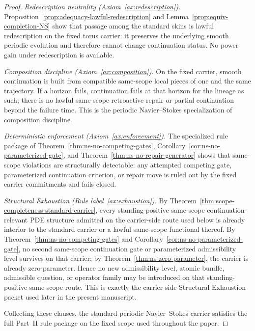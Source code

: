 \begin{proof}
\smallskip
\noindent\textit{Redescription neutrality (Axiom~\ref{ax:redescription}).}
Proposition~\ref{prop:adequacy-lawful-redescription} and Lemma~\ref{prop:equiv-completion-NS}
show that passage among the standard skins is lawful redescription on the fixed torus carrier: it
preserves the underlying smooth periodic evolution and therefore cannot change continuation status.
No power gain under redescription is available.

\smallskip
\noindent\textit{Composition discipline (Axiom~\ref{ax:composition}).}
On the fixed carrier, smooth continuation is built from compatible same-scope local pieces of one and
the same trajectory. If a horizon fails, continuation fails at that horizon for the lineage as such;
there is no lawful same-scope retroactive repair or partial continuation beyond the failure time.
This is the periodic Navier--Stokes specialization of composition discipline.

\smallskip
\noindent\textit{Deterministic enforcement (Axiom~\ref{ax:enforcement}).}
The specialized rule package of Theorem~\ref{thm:ns-no-competing-gates},
Corollary~\ref{cor:ns-no-parameterized-gate}, and Theorem~\ref{thm:ns-no-repair-generator}
shows that same-scope violations are structurally detectable: any attempted competing gate,
parameterized continuation criterion, or repair move is ruled out by the fixed carrier commitments and
fails closed.

\smallskip
\noindent\textit{Structural Exhaustion (Rule label~\ref{ax:exhaustion}).}
By Theorem~\ref{thm:scope-completeness-standard-carrier}, every standing-positive same-scope continuation-relevant PDE structure admitted on the carrier-side route used below is already interior to the standard carrier or a lawful same-scope functional thereof. By Theorem~\ref{thm:ns-no-competing-gates} and Corollary~\ref{cor:ns-no-parameterized-gate}, no second same-scope continuation gate or parameterized admissibility level survives on that carrier; by Theorem~\ref{thm:ns-zero-parameter}, the carrier is already zero-parameter. Hence no new admissibility level, atomic bundle, admissible question, or operator family may be introduced on that standing-positive same-scope route. This is exactly the carrier-side Structural Exhaustion packet used later in the present manuscript.

\smallskip
Collecting these clauses, the standard periodic Navier--Stokes carrier satisfies the full Part~II rule
package on the fixed scope used throughout the paper.
\end{proof}


